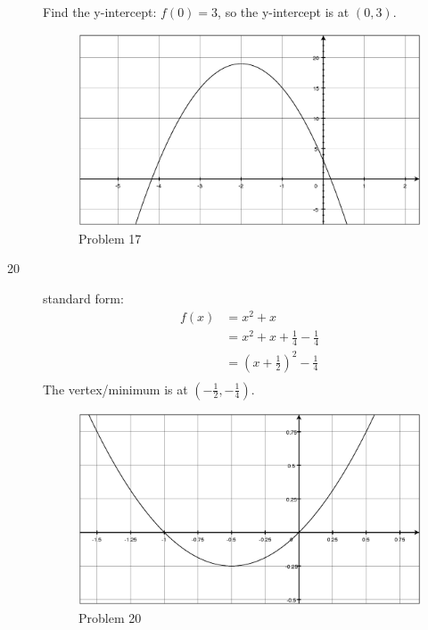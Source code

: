 \documentclass{exam}
\begin{document}
\begin{description}
      Find the y-intercept: $f(0) = 3$, so the y-intercept is at $(0, 3)$.

      \begin{figure}[H]
        \centering
        \includegraphics[scale=.3]{problem_17.eps}
        \caption*{Problem 17}
      \end{figure}

    \item[20]
      standard form:
      \begin{align*}
        f(x) &= x^2 + x \\
          &= x^2 + x + \frac{1}{4} - \frac{1}{4} \\
          &= \left(x + \frac{1}{2} \right)^2 - \frac{1}{4} \\
      \end{align*}
      The vertex/minimum is at $\left( - \frac{1}{2}, -\frac{1}{4} \right)$.

      \begin{figure}[H]
        \centering
        \includegraphics[scale=.3]{problem_20.eps}
        \caption*{Problem 20}
      \end{figure}


\end{description}
\end{document}
